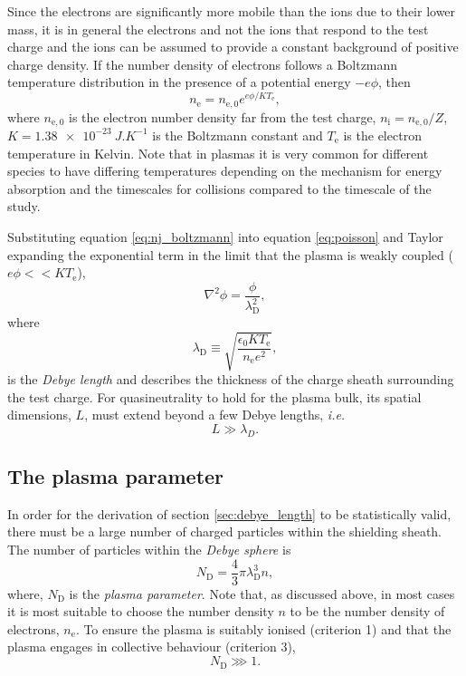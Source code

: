 Since the electrons are significantly more mobile than the ions due to their lower mass, it is in general the electrons and not the ions that respond to the test charge and the ions can be assumed to provide a constant background of positive charge density.
If the number density of electrons follows a Boltzmann temperature distribution in the presence of a potential energy $-e\phi$, then
\begin{equation}\label{eq:nj_boltzmann}
	n_\mathrm{e}= n_{\mathrm{e},0}e^{e\phi/KT_\mathrm{e}},
\end{equation}
where $n_{\mathrm{e},0}$ is the electron number density far from the test charge, $n_\mathrm{i} = n_{\mathrm{e},0}/Z$, $K = \qty{1.38e-23}{J.K^{-1}}$ is the Boltzmann constant and $T_\mathrm{e}$ is the electron temperature in Kelvin. Note that in plasmas it is very common for different species to have differing temperatures depending on the mechanism for energy absorption and the timescales for collisions compared to the timescale of the study.

Substituting equation \ref{eq:nj_boltzmann} into equation \ref{eq:poisson} and Taylor expanding the exponential term in the limit that the plasma is weakly coupled ($e\phi << KT_\mathrm{e}$), 
\begin{equation}\label{eq:poisson_debye2}
	\nabla^2\phi = \frac{\phi}{\lambda_\mathrm{D}^2},
\end{equation}
where
\begin{equation}\label{eq:debye}
	\lambda_\mathrm{D} \equiv \sqrt{\frac{\epsilon_0KT_\mathrm{e}}{n_\mathrm{e}e^2}},
\end{equation}
is the \textit{Debye length} and describes the thickness of the charge sheath surrounding the test charge. For quasineutrality to hold for the plasma bulk, its spatial dimensions, $L$, must extend beyond a few Debye lengths, \textit{i.e.}
\begin{equation}
	L \gg \lambda_D.
\end{equation}

\subsection{\label{sec:plasma_parameter}The plasma parameter}
In order for the derivation of section \ref{sec:debye_length} to be statistically valid, there must be a large number of charged particles within the shielding sheath. The number of particles within the \textit{Debye sphere} is
\begin{equation}\label{eq:plasma_parameter}
	N_\mathrm{D} = \frac{4}{3}\pi\lambda_\mathrm{D}^3n,
\end{equation}
where, $N_\mathrm{D}$ is the \textit{plasma parameter}. Note that, as discussed above, in most cases it is most suitable to choose the number density $n$ to be the number density of electrons, $n_\mathrm{e}$. To ensure the plasma is suitably ionised (criterion 1) and that the plasma engages in collective behaviour (criterion 3),
\begin{equation}\label{eq:plasma_parameter_condition}
	N_\mathrm{D} \ggg 1.
\end{equation}
